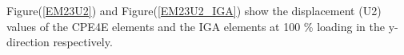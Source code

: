 \documentclass[11pt]{article}
\begin{document}
\noindent
Figure(\ref{EM23U2}) and Figure(\ref{EM23U2_IGA}) show the displacement (U2) values of the CPE4E elements and the IGA elements at 100 \% loading in the y-direction respectively. \\

\end{document}
